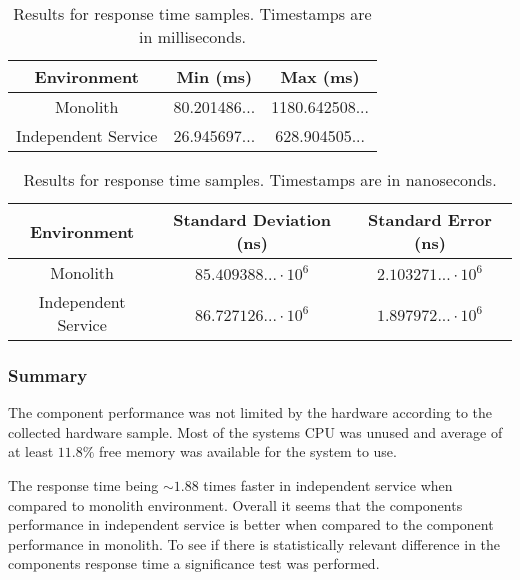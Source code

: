 \begin{table}[h!]
    \begin{tabular}{|c|c|c|} 
        \hline
        Environment
        & Min (ms)
        & Max (ms) \\ [0.5ex] 
        
        \hline\hline
        Monolith
        & 80.201486... 
        & 1180.642508... \\ 
        
        Independent Service
        & 26.945697... 
        & 628.904505...  \\
        \hline
    \end{tabular}
    \caption{Results for response time samples. Timestamps are in milliseconds.}
    \label{table:response time results:2}
\end{table}

\begin{table}[h!]
    \begin{tabular}{|c|c|c|} 
        \hline
        Environment
        & Standard Deviation (ns)
        & Standard Error (ns) \\ [0.5ex] 
        
        \hline\hline
        Monolith
        & $85.409388... \cdot 10^6$
        & $2.103271... \cdot 10^6$ \\ 
        
        Independent Service
        & $86.727126... \cdot 10^6$
        & $1.897972... \cdot 10^6$ \\ 
         \hline
    \end{tabular}
    \caption{Results for response time samples. Timestamps are in nanoseconds.}
    \label{table:response time results:3}
\end{table}

\subsubsection{Summary}
The component performance was not limited by the hardware according to the collected hardware sample.
Most of the systems CPU was unused and average of at least $11.8\%$ free memory was available for the system to use.

The response time being $\sim1.88$ times faster in independent service when compared to monolith environment.
Overall it seems that the components performance in independent service is better when compared to the component performance in monolith.
To see if there is statistically relevant difference in the components response time a significance test was performed.

